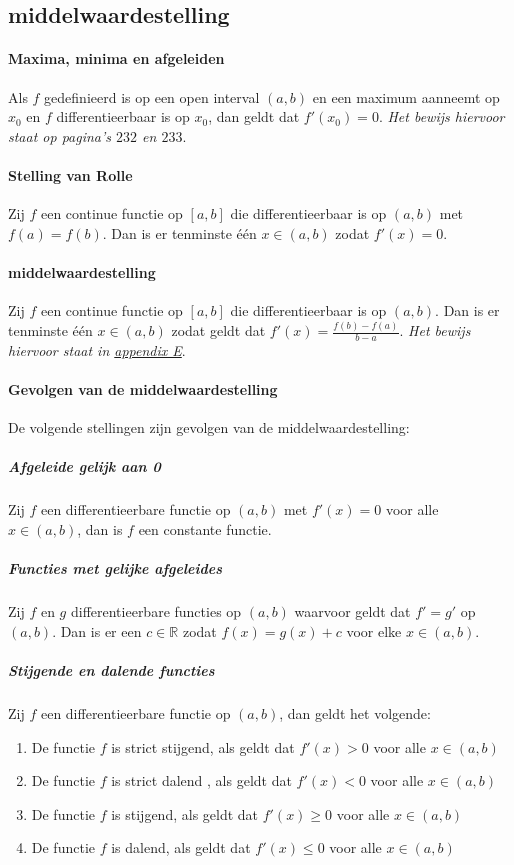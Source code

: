 \subsection{middelwaardestelling}

\paragraph{Maxima, minima en afgeleiden} Als $f$ gedefinieerd is op een open interval $(a,b)$ en een maximum aanneemt op $x_{0}$ en $f$ differentieerbaar is op $x_{0}$, dan geldt dat $f'(x_{0})=0$. \textit{Het bewijs hiervoor staat op pagina's $232$ en $233$}.

\paragraph{Stelling van Rolle} Zij $f$ een continue functie op $[a,b]$ die differentieerbaar is op $(a,b)$ met $f(a)=f(b)$. Dan is er tenminste één $x\in(a,b)$ zodat $f'(x)=0$.

\paragraph{middelwaardestelling} Zij $f$ een continue functie op $[a,b]$ die differentieerbaar is op $(a,b)$. Dan is er tenminste één $x\in(a,b)$ zodat geldt dat $f'(x)=\frac{f(b)-f(a)}{b-a}$. \textit{Het bewijs hiervoor staat in \hyperref[sec:AE]{appendix E}}.

\paragraph{Gevolgen van de middelwaardestelling} De volgende stellingen zijn gevolgen van de middelwaardestelling:

\subparagraph{Afgeleide gelijk aan 0} Zij $f$ een differentieerbare functie op $(a,b)$ met $f'(x)=0$ voor alle $x\in(a,b)$, dan is $f$ een constante functie.

\subparagraph{Functies met gelijke afgeleides} Zij $f$ en $g$ differentieerbare functies op $(a,b)$ waarvoor geldt dat $f'=g'$ op $(a,b)$. Dan is er een $c\in\mathbb{R}$ zodat $f(x)=g(x)+c$ voor elke $x\in(a,b)$.

\subparagraph{Stijgende en dalende functies} Zij $f$ een differentieerbare functie op $(a,b)$, dan geldt het volgende:

\begin{enumerate}
  \setlength\itemsep{0em}
  \item De functie $f$ is strict stijgend, als geldt dat $f'(x)>0$ voor alle $x\in(a,b)$
  \item De functie $f$ is strict dalend , als geldt dat $f'(x)<0$ voor alle $x\in(a,b)$
  \item De functie $f$ is stijgend, als geldt dat $f'(x)\geq0$ voor alle $x\in(a,b)$
  \item De functie $f$ is dalend, als geldt dat $f'(x)\leq0$ voor alle $x\in(a,b)$
\end{enumerate}

